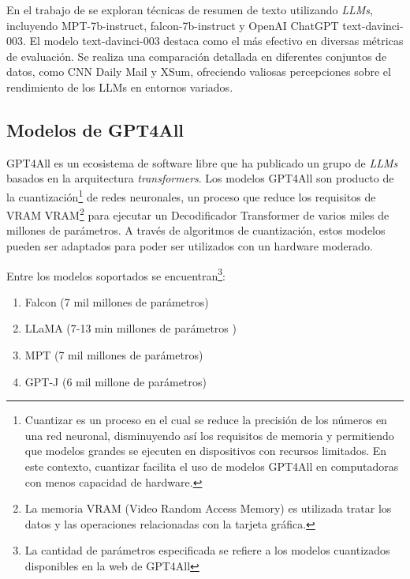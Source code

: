     En el trabajo de \cite[(Basyal et al. 2023)]{basyal2023text} se exploran técnicas de resumen de texto utilizando \emph{LLMs}, incluyendo MPT-7b-instruct, falcon-7b-instruct y OpenAI ChatGPT text-davinci-003. El modelo text-davinci-003 destaca como el más efectivo en diversas métricas de evaluación. Se realiza una comparación detallada en diferentes conjuntos de datos, como CNN Daily Mail y XSum, ofreciendo valiosas percepciones sobre el rendimiento de los LLMs en entornos variados. 

    \subsection{Modelos de GPT4All}

        GPT4All es un ecosistema de software libre que ha publicado un grupo de \emph{LLMs} basados en la arquitectura \emph{transformers}\cite{attention}. Los modelos GPT4All son producto de la cuantización\footnote{Cuantizar es un proceso en el cual se reduce la precisión de los números en una red neuronal, disminuyendo así los requisitos de memoria y permitiendo que modelos grandes se ejecuten en dispositivos con recursos limitados. En este contexto, cuantizar facilita el uso de modelos GPT4All en computadoras con menos capacidad de hardware.} de redes neuronales, un proceso que reduce los requisitos de VRAM VRAM\footnote{La memoria VRAM (Video Random Access Memory) es utilizada tratar los datos y las operaciones relacionadas con la tarjeta gráfica.} para ejecutar un Decodificador Transformer de varios miles de millones de parámetros. A través de algoritmos de cuantización, estos modelos pueden ser adaptados para poder ser utilizados con un hardware moderado\cite{webgpt4all}.
        
        Entre los modelos soportados se encuentran\footnote{La cantidad de parámetros especificada se refiere a los modelos cuantizados disponibles en la web de GPT4All}:
        \begin{enumerate}
            \item Falcon (7 mil millones de parámetros) \cite{falcon}
            \item LLaMA (7-13 min millones de parámetros )\cite{llama}
            \item MPT (7 mil millones de parámetros) \cite{mpt}
            \item GPT-J (6 mil millone de parámetros)\cite{gptj}
        \end{enumerate}

